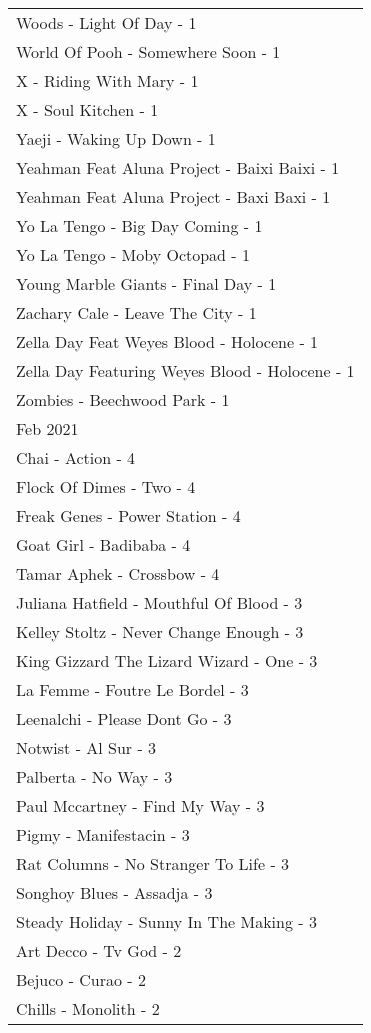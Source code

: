 \documentclass[
]{article}
\begin{document}
\begin{longtable}{l}
Woods - Light Of Day - 1 \\ 
World Of Pooh - Somewhere Soon - 1 \\ 
X - Riding With Mary - 1 \\ 
X - Soul Kitchen - 1 \\ 
Yaeji - Waking Up Down - 1 \\ 
Yeahman Feat Aluna Project - Baixi Baixi - 1 \\ 
Yeahman Feat Aluna Project - Baxi Baxi - 1 \\ 
Yo La Tengo - Big Day Coming - 1 \\ 
Yo La Tengo - Moby Octopad - 1 \\ 
Young Marble Giants - Final Day - 1 \\ 
Zachary Cale - Leave The City - 1 \\ 
Zella Day Feat Weyes Blood - Holocene - 1 \\ 
Zella Day Featuring Weyes Blood - Holocene - 1 \\ 
Zombies - Beechwood Park - 1 \\ 
\midrule
\multicolumn{1}{l}{Feb 2021} \\ 
\midrule
Chai - Action - 4 \\ 
Flock Of Dimes - Two - 4 \\ 
Freak Genes - Power Station - 4 \\ 
Goat Girl - Badibaba - 4 \\ 
Tamar Aphek - Crossbow - 4 \\ 
Juliana Hatfield - Mouthful Of Blood - 3 \\ 
Kelley Stoltz - Never Change Enough - 3 \\ 
King Gizzard The Lizard Wizard - One - 3 \\ 
La Femme - Foutre Le Bordel - 3 \\ 
Leenalchi - Please Dont Go - 3 \\ 
Notwist - Al Sur - 3 \\ 
Palberta - No Way - 3 \\ 
Paul Mccartney - Find My Way - 3 \\ 
Pigmy - Manifestacin - 3 \\ 
Rat Columns - No Stranger To Life - 3 \\ 
Songhoy Blues - Assadja - 3 \\ 
Steady Holiday - Sunny In The Making - 3 \\ 
Art Decco - Tv God - 2 \\ 
Bejuco - Curao - 2 \\ 
Chills - Monolith - 2 \\ 

\end{longtable}
\end{document}
